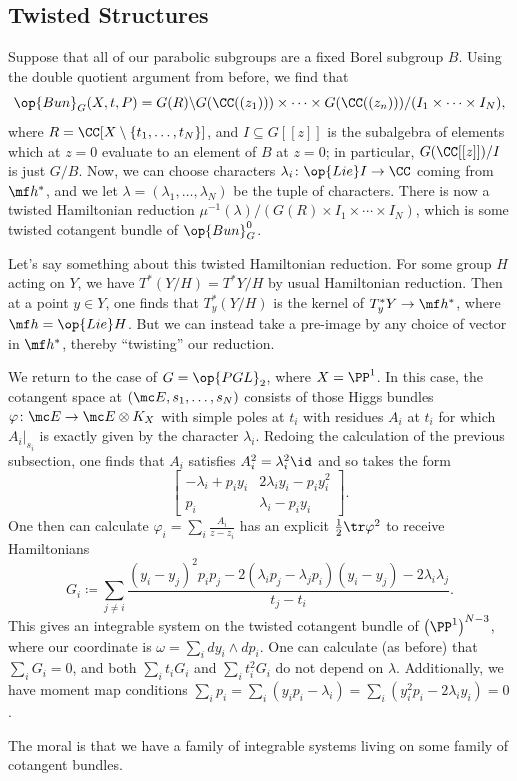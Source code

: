 \documentclass[../notes.tex]{subfiles}
\begin{document}
\subsection{Twisted Structures}
Suppose that all of our parabolic subgroups are a fixed Borel subgroup $B$. Using the double quotient argument from before, we find that
\[\op{Bun}_G(X,t,P)=G(R)\backslash G(\CC((z_1)))\times\cdots\times G(\CC((z_n)))/(I_1\times\cdots\times I_N),\]
where $R=\CC[X\setminus\{t_1,\ldots,t_N\}]$, and $I\subseteq G[[z]]$ is the subalgebra of elements which at $z=0$ evaluate to an element of $B$ at $z=0$; in particular, $G(\CC[[z]])/I$ is just $G/B$. Now, we can choose characters $\lambda_i\colon\op{Lie}I\to\CC$ coming from $\mf h^*$, and we let $\lambda=(\lambda_1,\ldots,\lambda_N)$ be the tuple of characters. There is now a twisted Hamiltonian reduction $\mu^{-1}(\lambda)/(G(R)\times I_1\times\cdots\times I_N)$, which is some twisted cotangent bundle of $\op{Bun}_G^0$.
\begin{remark}
	Let's say something about this twisted Hamiltonian reduction. For some group $H$ acting on $Y$, we have $T^*(Y/H)=T^*Y/H$ by usual Hamiltonian reduction. Then at a point $y\in Y$, one finds that $T_y^*(Y/H)$ is the kernel of $T_y^*Y\to\mf h^*$, where $\mf h=\op{Lie}H$. But we can instead take a pre-image by any choice of vector in $\mf h^*$, thereby ``twisting'' our reduction.
\end{remark}
\begin{example}
	We return to the case of $G=\op{PGL}_2$, where $X=\PP^1$. In this case, the cotangent space at $(\mc E,s_1,\ldots,s_N)$ consists of those Higgs bundles $\varphi\colon\mc E\to\mc E\otimes K_X$ with simple poles at $t_i$ with residues $A_i$ at $t_i$ for which $A_i|_{s_i}$ is exactly given by the character $\lambda_i$. Redoing the calculation of the previous subsection, one finds that $A_i$ satisfies $A_i^2=\lambda_i^2\id$ and so takes the form
	\[\begin{bmatrix}
		-\lambda_i+p_iy_i & 2\lambda_iy_i-p_iy_i^2 \\
		p_i & \lambda_i-p_iy_i
	\end{bmatrix}.\]
	One then can calculate $\varphi_i=\sum_i\frac{A_i}{z-z_i}$ has an explicit $\frac12\tr\varphi^2$ to receive Hamiltonians
	\[G_i\coloneqq\sum_{j\ne i}\frac{(y_i-y_j)^2p_ip_j-2(\lambda_ip_j-\lambda_jp_i)(y_i-y_j)-2\lambda_i\lambda_j}{t_j-t_i}.\]
	This gives an integrable system on the twisted cotangent bundle of $\left(\PP^1\right)^{N-3}$, where our coordinate is $\omega=\sum_idy_i\land dp_i$. One can calculate (as before) that $\sum_iG_i=0$, and both $\sum_it_iG_i$ and $\sum_it_i^2G_i$ do not depend on $\lambda$. Additionally, we have moment map conditions $\sum_ip_i=\sum_i(y_ip_i-\lambda_i)=\sum_i\left(y_i^2p_i-2\lambda_iy_i\right)=0$.
\end{example}
The moral is that we have a family of integrable systems living on some family of cotangent bundles.
\end{document}
